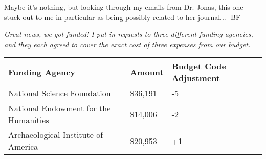 Maybe it's nothing, but looking through my emails from Dr. Jonas,
this one stuck out to me in particular as being possibly related
to her journal... -BF

\textit{Great news, we got funded! I put in requests to three different funding agencies,
and they each agreed to cover the exact cost of three expenses from our budget.}

\begin{center}
\begin{tabular}{lll}
\textbf{Funding Agency}               & \textbf{Amount} & \textbf{Budget Code Adjustment} \\\hline
National Science Foundation           & \$36,191        & -5\\
National Endowment for the Humanities & \$14,006        & -2\\
Archaeological Institute of America   & \$20,953        & +1
\end{tabular}
\end{center}

